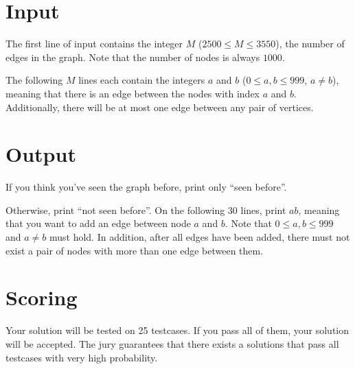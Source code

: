 \section*{Input}
The first line of input contains the integer $M$ ($2500 \leq M \leq 3550$), the number of edges in the graph. Note that
the number of nodes is always $1000$.

The following $M$ lines each contain the integers $a$ and $b$ ($0 \leq a,b \leq 999$, $a \neq b$), meaning that there is an edge
between the nodes with index $a$ and $b$. Additionally, there will be at most one edge between any pair of vertices.

\section*{Output}
If you think you've seen the graph before, print only ``seen before''.

Otherwise, print ``not seen before''. On the following $30$ lines, print $a b$, meaning that you want to add
an edge between node $a$ and $b$. Note that $0 \leq a,b \leq 999$ and $a \neq b$ must hold. In addition, after
all edges have been added, there must not exist a pair of nodes with more than one edge between them.

\section*{Scoring}
Your solution will be tested on 25 testcases. If you pass all of them, your solution will be accepted.
The jury guarantees that there exists a solutions that pass all testcases with very high probability.
